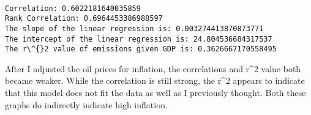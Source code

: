 \documentclass[11pt]{article}
\begin{document}
    \begin{center}
    \end{center}
    { \hspace*{\fill} \\}
    
    \begin{Verbatim}[commandchars=\\\{\}]
Correlation: 0.6022181640035859
Rank Correlation: 0.6964453386988597
The slope of the linear regression is: 0.003274413870873771
The intercept of the linear regression is: 24.804536684317537
The r\^{}2 value of emissions given GDP is: 0.3626667170558495

    \end{Verbatim}

    After I adjusted the oil prices for inflation, the correlations and
r\^{}2 value both became weaker. While the correlation is still strong,
the r\^{}2 appears to indicate that this model does not fit the data as
well as I previously thought. Both these graphs do indirectly indicate
high inflation.
\end{document}
